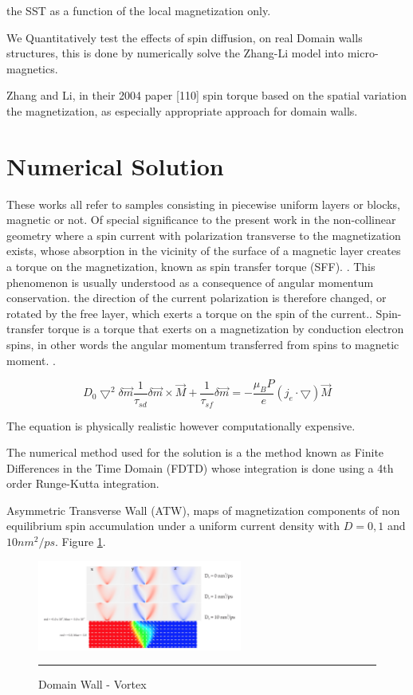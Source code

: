 the SST as a function of the local magnetization only. 


We Quantitatively test the effects of spin diffusion, on real Domain walls structures, this is done by numerically solve the Zhang-Li model \cite{zhang} into micro-magnetics.

Zhang and Li, in their 2004 paper [110]
spin torque based on the spatial variation the magnetization, as especially appropriate approach for domain walls.

\section{Numerical Solution}

 These works all refer to samples consisting in piecewise uniform layers or blocks, magnetic or not. Of special significance to the present work in the non-collinear geometry where a spin current with polarization transverse to the magnetization exists, whose absorption in the vicinity of the surface of a magnetic layer creates a torque on the magnetization, known as spin transfer torque (SFF).  \cite{claudio}. This phenomenon is usually understood as a consequence of angular momentum conservation. the direction of the current polarization is therefore changed, or rotated by the free layer, which exerts a torque on the spin of the current.\cite{nonlocalspin}. Spin-transfer torque is a torque that exerts on a magnetization by conduction electron spins, in other words the angular momentum transferred from spins to magnetic  moment. \cite{zhang}.

\begin{equation}
D_{0}\bigtriangledown^{2} \delta \vec{m}  \frac{1}{\tau_{sd}} \delta \vec{m} \times \vec{M} + \frac{1}{\tau_{sf}}\delta \vec{m} = -\frac{\mu_{B}P}{e}(j_{e} \cdot \bigtriangledown) \vec{M}
\end{equation}


The equation is physically realistic however computationally expensive.


The numerical method used for the solution is a the method known as Finite Differences in the Time Domain (FDTD) whose integration is done using a 4th order Runge-Kutta integration.



Asymmetric Transverse Wall (ATW), maps of magnetization components of non equilibrium spin accumulation under a uniform current density with $D = 0, 1$ and $10 nm^2 / ps$. Figure \ref{fig:atw}.

\begin{figure}[htbp]
	\centering
		\includegraphics[width=0.6\textwidth]{Figures/ATW.png}
		\rule{35em}{0.5pt}
	\caption[Domain Wall - Vortex]{Domain Wall - Vortex}
	\label{fig:atw}
\end{figure}

